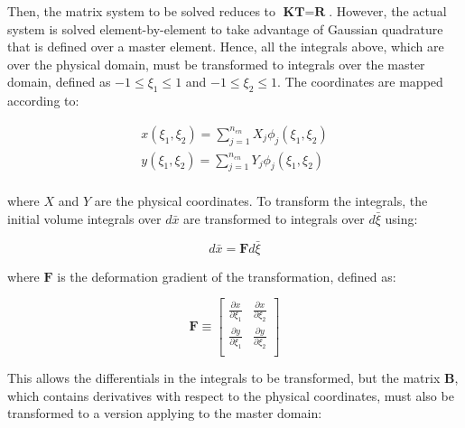 \documentclass[10pt]{article}
\begin{document}
Then, the matrix system to be solved reduces to \(\textbf{K}\textbf{T}=\textbf{R}\). However, the actual system is solved element-by-element to take advantage of Gaussian quadrature that is defined over a master element. Hence, all the integrals above, which are over the physical domain, must be transformed to integrals over the master domain, defined as \(-1\leq\xi_1\leq1\) and \(-1\leq\xi_2\leq1\). The coordinates are mapped according to:

\begin{equation}
\begin{aligned}
x(\xi_1,\xi_2)=\sum_{j=1}^{n_{en}}X_{j}\phi_j(\xi_1,\xi_2)\\
y(\xi_1,\xi_2)=\sum_{j=1}^{n_{en}}Y_{j}\phi_j(\xi_1,\xi_2)\\
\end{aligned}
\end{equation}

where \(X\) and \(Y\) are the physical coordinates. To transform the integrals, the initial volume integrals over \(d\bar{x}\) are transformed to integrals over \(d\bar{\xi}\) using:

\begin{equation}
d\bar{x}=\textbf{F}d\bar{\xi}
\end{equation}

where \(\textbf{F}\) is the deformation gradient of the transformation, defined as:

\begin{equation}
\textbf{F}\equiv\begin{bmatrix}
\frac{\partial x}{\partial \xi_1} & \frac{\partial x}{\partial \xi_2} \\
\frac{\partial y}{\partial \xi_1} & \frac{\partial y}{\partial \xi_2} \\
\end{bmatrix}
\end{equation}

This allows the differentials in the integrals to be transformed, but the matrix \textbf{B}, which contains derivatives with respect to the physical coordinates, must also be transformed to a version applying to the master domain:
\end{document}
